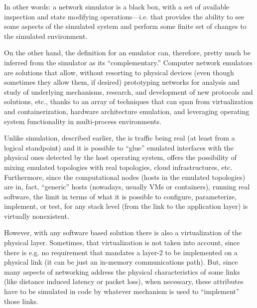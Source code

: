 In other words: a network simulator is a black box, with a set of available inspection and state modifying operations---i.e. that provides the ability to see some aspects of the simulated system and perform some finite set of changes to the simulated environment.

On the other hand, the definition for an emulator can, therefore, pretty much be inferred from the simulator as its ``complementary.''
Computer network emulators are solutions that allow, without resorting to physical devices (even though sometimes they allow them, if desired) prototyping networks for analysis and study of underlying mechanisms, research, and development of new protocols and solutions, etc., thanks to an array of techniques that can span from virtualization and containerization, hardware architecture emulation, and leveraging operating system functionality in multi-process environments.

Unlike simulation, described earlier, the is traffic being real (at least from a logical standpoint) and it is possible to ``glue'' emulated interfaces with the physical ones detected by the host operating system, offers the possibility of mixing emulated topologies with real topologies, cloud infrastructures, etc.
Furthermore, since the computational nodes (hosts in the emulated topologies) are in, fact, ``generic'' hosts (nowadays, usually VMs or containers), running real software, the limit in terms of what it is possible to configure, parameterize, implement, or test, for any stack level (from the link to the application layer) is virtually nonexistent.

However, with any software based solution there is also a virtualization of the physical layer.
Sometimes, that virtualization is not taken into account, since there is e.g. no requirement that mandates a layer-2 to be implemented on a physical link (it can be just an in-memory communications path).
But, since many aspects of networking address the physical characteristics of some links (like distance induced latency or packet loss), when necessary, these attributes have to be simulated in code by whatever mechanism is used to ``implement'' those links.

